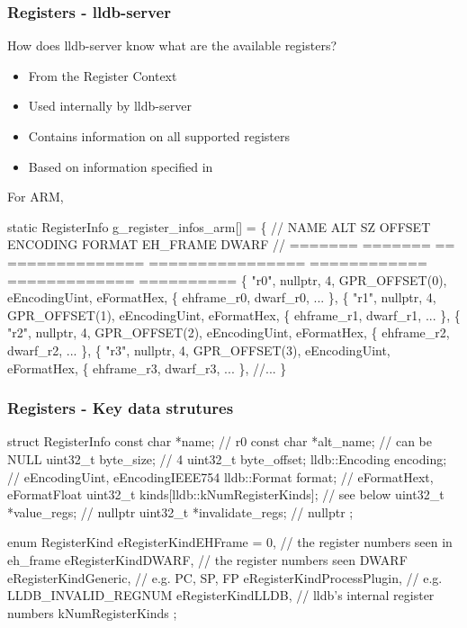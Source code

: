 \begin{frame}[fragile]
    \frametitle{Registers - lldb-server}
How does lldb-server know what are the available registers?
\begin{itemize}
\item From the Register Context
\item Used internally by lldb-server
\item Contains information on all supported registers
\item Based on information specified in 
\end{itemize}
For ARM,
\begin{codebox2}
static RegisterInfo g_register_infos_arm[] = \{
//  NAME     ALT     SZ   OFFSET          ENCODING          FORMAT         EH_FRAME      DWARF       
//  =======  ======= ==   ==============  ================  ============   ============= ==========  
\{   "r0",    nullptr, 4,  GPR_OFFSET(0),  eEncodingUint,    eFormatHex,  \{ ehframe_r0,   dwarf_r0, ...   \},
\{   "r1",    nullptr, 4,  GPR_OFFSET(1),  eEncodingUint,    eFormatHex,  \{ ehframe_r1,   dwarf_r1, ...   \},
\{   "r2",    nullptr, 4,  GPR_OFFSET(2),  eEncodingUint,    eFormatHex,  \{ ehframe_r2,   dwarf_r2, ...   \},
\{   "r3",    nullptr, 4,  GPR_OFFSET(3),  eEncodingUint,    eFormatHex,  \{ ehframe_r3,   dwarf_r3, ...   \},
//...
\}
\end{codebox2}
\end{frame}

\begin{frame}[fragile]
\frametitle{Registers - Key data strutures}
\begin{codebox}
    struct RegisterInfo
    {
        const char *name;                        // r0
        const char *alt_name;                    // can be NULL
        uint32_t byte_size;                      // 4
        uint32_t byte_offset;                    
        lldb::Encoding encoding;                 // eEncodingUint, eEncodingIEEE754
        lldb::Format format;                     // eFormatHext, eFormatFloat
        uint32_t kinds[lldb::kNumRegisterKinds]; // see below
        uint32_t *value_regs;                    // nullptr
        uint32_t *invalidate_regs;               // nullptr
    };
\end{codebox}

\begin{codebox}
    enum RegisterKind
    {
        eRegisterKindEHFrame = 0,   // the register numbers seen in eh_frame
        eRegisterKindDWARF,         // the register numbers seen DWARF
        eRegisterKindGeneric,       // e.g. PC, SP, FP
        eRegisterKindProcessPlugin, // e.g. LLDB_INVALID_REGNUM
        eRegisterKindLLDB,          // lldb's internal register numbers
        kNumRegisterKinds
    };
\end{codebox}

\end{frame}

